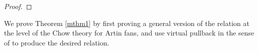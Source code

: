 \documentclass[12pt, oneside]{amsart}   	%
\newcounter{thm}
\newtheorem{remark}[thm]{Remark}
\newcommand{\NN}{\mathbb{N}}
\newcommand{\kk}{\mathds{k}}
\newcommand{\ev}{\operatorname{ev}}
\newcommand{\Spec}{\operatorname{Spec}}
\newcommand{\gp}{\operatorname{gp}}
\numberwithin{equation}{section}
\numberwithin{thm}{section}
\numberwithin{figure}{section}
\begin{document}
\begin{proof}

\end{proof}

 


We prove Theorem \ref{mthm1} by first proving a general version of the relation at the level of the Chow theory for Artin fans, and use virtual pullback in the sense of \cite{vpull} to produce the desired relation. 


\end{document}
